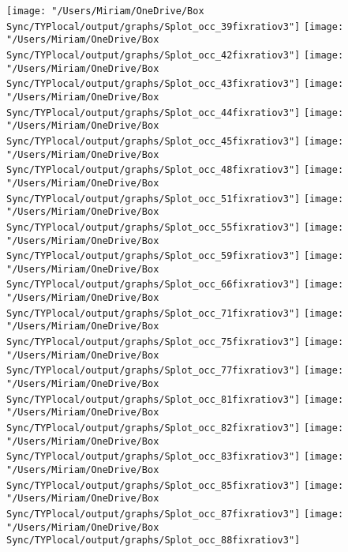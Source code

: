 \documentclass[11pt]{article}
\begin{document}
\newline
\texttt{[image: "/Users/Miriam/OneDrive/Box Sync/TYPlocal/output/graphs/Splot\_occ\_39fixratiov3"]}
\newline
\texttt{[image: "/Users/Miriam/OneDrive/Box Sync/TYPlocal/output/graphs/Splot\_occ\_42fixratiov3"]}
\newline
\texttt{[image: "/Users/Miriam/OneDrive/Box Sync/TYPlocal/output/graphs/Splot\_occ\_43fixratiov3"]}
\newline
\texttt{[image: "/Users/Miriam/OneDrive/Box Sync/TYPlocal/output/graphs/Splot\_occ\_44fixratiov3"]}
\newline
\texttt{[image: "/Users/Miriam/OneDrive/Box Sync/TYPlocal/output/graphs/Splot\_occ\_45fixratiov3"]}
\newline
\texttt{[image: "/Users/Miriam/OneDrive/Box Sync/TYPlocal/output/graphs/Splot\_occ\_48fixratiov3"]}
\newline
\texttt{[image: "/Users/Miriam/OneDrive/Box Sync/TYPlocal/output/graphs/Splot\_occ\_51fixratiov3"]}
\newline
\texttt{[image: "/Users/Miriam/OneDrive/Box Sync/TYPlocal/output/graphs/Splot\_occ\_55fixratiov3"]}
\newline
\texttt{[image: "/Users/Miriam/OneDrive/Box Sync/TYPlocal/output/graphs/Splot\_occ\_59fixratiov3"]}
\newline
\texttt{[image: "/Users/Miriam/OneDrive/Box Sync/TYPlocal/output/graphs/Splot\_occ\_66fixratiov3"]}
\newline
\texttt{[image: "/Users/Miriam/OneDrive/Box Sync/TYPlocal/output/graphs/Splot\_occ\_71fixratiov3"]}
\newline
\texttt{[image: "/Users/Miriam/OneDrive/Box Sync/TYPlocal/output/graphs/Splot\_occ\_75fixratiov3"]}
\newline
\texttt{[image: "/Users/Miriam/OneDrive/Box Sync/TYPlocal/output/graphs/Splot\_occ\_77fixratiov3"]}
\newline
\texttt{[image: "/Users/Miriam/OneDrive/Box Sync/TYPlocal/output/graphs/Splot\_occ\_81fixratiov3"]}
\newline
\texttt{[image: "/Users/Miriam/OneDrive/Box Sync/TYPlocal/output/graphs/Splot\_occ\_82fixratiov3"]}
\newline
\texttt{[image: "/Users/Miriam/OneDrive/Box Sync/TYPlocal/output/graphs/Splot\_occ\_83fixratiov3"]}
\newline
\texttt{[image: "/Users/Miriam/OneDrive/Box Sync/TYPlocal/output/graphs/Splot\_occ\_85fixratiov3"]}
\newline
\texttt{[image: "/Users/Miriam/OneDrive/Box Sync/TYPlocal/output/graphs/Splot\_occ\_87fixratiov3"]}
\newline
\texttt{[image: "/Users/Miriam/OneDrive/Box Sync/TYPlocal/output/graphs/Splot\_occ\_88fixratiov3"]}
\newline
\end{document}
